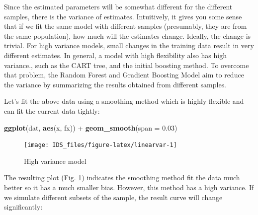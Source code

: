 \documentclass[12pt,]{krantz}
\newenvironment{Shaded}{\begin{snugshade}}{\end{snugshade}}
\newcommand{\KeywordTok}[1]{\textcolor[rgb]{0.13,0.29,0.53}{\textbf{{#1}}}}
\newcommand{\DataTypeTok}[1]{\textcolor[rgb]{0.13,0.29,0.53}{{#1}}}
\newcommand{\FloatTok}[1]{\textcolor[rgb]{0.00,0.00,0.81}{{#1}}}
\newcommand{\StringTok}[1]{\textcolor[rgb]{0.31,0.60,0.02}{{#1}}}
\newcommand{\NormalTok}[1]{{#1}}
\theoremstyle{definition}
\theoremstyle{definition}
\theoremstyle{remark}
\begin{document}
Since the estimated parameters will be somewhat different for the
different samples, there is the variance of estimates. Intuitively, it
gives you some sense that if we fit the same model with different
samples (presumably, they are from the same population), how much will
the estimates change. Ideally, the change is trivial. For high variance
models, small changes in the training data result in very different
estimates. In general, a model with high flexibility also has high
variance., such as the CART tree, and the initial boosting method. To
overcome that problem, the Random Forest and Gradient Boosting Model aim
to reduce the variance by summarizing the results obtained from
different samples.

Let's fit the above data using a smoothing method which is highly
flexible and can fit the current data tightly:

\begin{Shaded}
\begin{Highlighting}[]
\KeywordTok{ggplot}\NormalTok{(dat, }\KeywordTok{aes}\NormalTok{(x, fx)) +}\StringTok{ }\KeywordTok{geom_smooth}\NormalTok{(}\DataTypeTok{span =} \FloatTok{0.03}\NormalTok{)}
\end{Highlighting}
\end{Shaded}

\begin{figure}

{\centering \texttt{[image: IDS\_files/figure-latex/linearvar-1]} 

}

\caption{High variance model}\label{fig:linearvar}
\end{figure}

The resulting plot (Fig. \ref{fig:linearvar}) indicates the smoothing
method fit the data much better so it has a much smaller bias. However,
this method has a high variance. If we simulate different subsets of the
sample, the result curve will change significantly:
\end{document}
